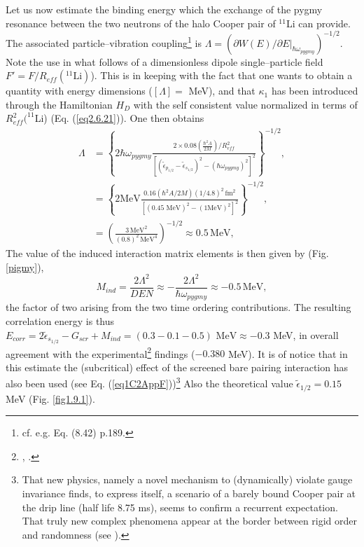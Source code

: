  Let us now estimate the binding energy which the exchange of the pygmy resonance between the two neutrons of the halo Cooper pair  of $^{11}$Li can provide.
The associated particle--vibration coupling\footnote{cf. e.g. \cite{Brink:05} Eq. (8.42) p.189.} is $\Lambda= \left(\partial W(E)/\partial E|_{\hbar\omega_{pygmy}}\right)^{-1/2}$. Note the use in what follows of a dimensionless dipole single--particle field $F'=F/R_{eff}(^{11}\text{Li})$). This is in keeping with the fact that one wants to obtain a quantity with energy dimensions ($[\Lambda]=$ MeV), and that $\kappa_1$ has been introduced through the Hamiltonian $H_D$ with the self consistent value normalized in terms of $R_{eff}^2(^{11}$Li) (Eq. (\ref{eq2.6.21})). 
 One then obtains
\begin{equation}
\begin{split}
\Lambda&=\left\{2\hbar \omega_{pygmy}\frac{2\times 0.08(\frac{\hbar^2A}{2M})/R_{eff}^2}{\left[(\tilde\epsilon_{p_{1/2}}-\tilde\epsilon_{s_{1/2}})^2-(\hbar\omega_{pygmy})^2\right]^2}\right\}^{-1/2},\\
&=\left\{2\text{MeV}\frac{0.16(\hbar^2A/2M)(1/4.8)^2\,\text{fm}^2}{\left[(0.45\text{ MeV})^2-(1\text{MeV})^2\right]^2}\right\}^{-1/2},\\
&=\left(\frac{3\,\text{MeV}^2}{(0.8)^2\,\text{MeV}^4}\right)^{-1/2}\approx 0.5\,\text{MeV},
\end{split}
\end{equation}   
The value of the induced interaction matrix elements is then given by (Fig. \ref{pigmy}),
 \begin{equation}\label{eq2.F.10}
M_{ind}=\frac{2\Lambda^2}{DEN}\approx-\frac{2\Lambda^2}{\hbar\omega_{pygmy}}\approx-0.5\,\text{MeV},
 \end{equation}
 the factor of two arising from the two time ordering contributions. The resulting correlation energy is thus $E_{corr}=2\tilde\epsilon_{s_{1/2}}-G_{scr}+M_{ind}=(0.3-0.1-0.5)\text{ MeV}\approx- 0.3$ MeV, in overall agreement with the experimental\footnote{\cite{Bachelet:08}, \cite{Smith:08}.} findings ($-0.380$ MeV). It is of notice that in this estimate the (subcritical) effect of the screened bare pairing interaction has also been used (see Eq. (\ref{eq1C2AppF}))\footnote{That new physics, namely a novel mechanism to (dynamically) violate gauge invariance finds, to express itself, a scenario of a barely bound Cooper pair at the drip line (half life 8.75 ms), seems to confirm a recurrent expectation. That truly new complex phenomena appear at the border between rigid order and randomness (see \cite{DeGennes:94}).} Also the theoretical value $\tilde\epsilon_{1/2}=0.15$ MeV (Fig. \ref{fig1.9.1}).
 
